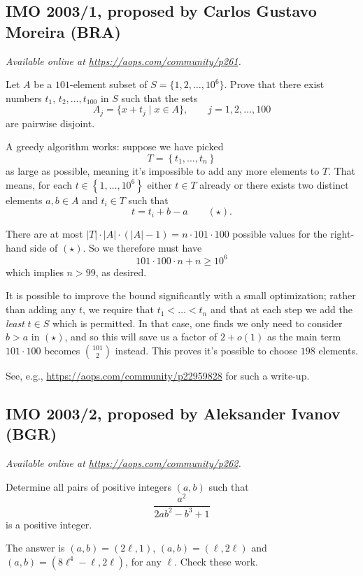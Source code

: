 \documentclass[11pt]{scrartcl}
\begin{document}
\subsection{IMO 2003/1, proposed by Carlos Gustavo Moreira (BRA)}
\textsl{Available online at \url{https://aops.com/community/p261}.}
\begin{mdframed}[style=mdpurplebox,frametitle={Problem statement}]
Let $A$ be a $101$-element subset of $S=\{1,2,\dots,10^6\}$.
Prove that there exist numbers $t_1$, $t_2, \dots, t_{100}$ in $S$ such that the sets
\[ A_j=\{x+t_j\mid x\in A\},\qquad j=1,2,\dots,100  \]
are pairwise disjoint.
\end{mdframed}
A greedy algorithm works: suppose we have picked
\[ T = \left\{ t_1, \dots, t_n \right\} \]
as large as possible, meaning it's impossible to add any more elements to $T$.
That means, for each $t \in \left\{ 1, \dots, 10^6 \right\}$ either $t \in T$ already
or there exists two distinct elements $a, b \in A$ and $t_i \in T$ such that
\[ t = t_i + b - a \qquad (\star).  \]

There are at most
$|T| \cdot |A| \cdot \left( |A|-1 \right) = n \cdot 101 \cdot 100$
possible values for the right-hand side of $(\star)$.
So we therefore must have
\[ 101 \cdot 100 \cdot n + n \ge 10^6 \]
which implies $n > 99$, as desired.

\begin{remark*}
  It is possible to improve the bound significantly with a small optimization;
  rather than adding any $t$, we require that $t_1 < \dots < t_n$
  and that at each step we add the \emph{least} $t \in S$ which is permitted.
  In that case, one finds we only need to consider $b > a$ in $(\star)$,
  and so this will save us a factor of $2+o(1)$
  as the main term $101 \cdot 100$ becomes $\binom{101}{2}$ instead.
  This proves it's possible to choose $198$ elements.

  See, e.g., \url{https://aops.com/community/p22959828} for such a write-up.
\end{remark*}
\pagebreak

\subsection{IMO 2003/2, proposed by Aleksander Ivanov (BGR)}
\textsl{Available online at \url{https://aops.com/community/p262}.}
\begin{mdframed}[style=mdpurplebox,frametitle={Problem statement}]
Determine all pairs of positive integers $(a,b)$ such that
\[ \frac{a^2}{2ab^2-b^3+1} \]
is a positive integer.
\end{mdframed}
The answer is $(a,b) = (2\ell, 1)$, $(a,b) = (\ell, 2\ell)$
and $(a,b) = (8\ell^4-\ell, 2\ell)$, for any $\ell$.
Check these work.
\end{document}
